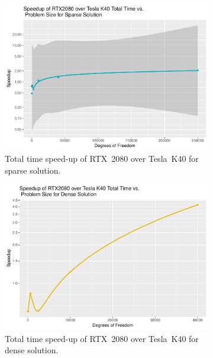 \begin{figure}
	\centering
	\begin{subfigure}{0.48\linewidth}
		\centering
		\includegraphics[width = \linewidth]{Plots/total_sparse_rtx_speedup_vs_n}
		\caption{Total time speed-up of RTX~2080 over Tesla~K40 for sparse solution.}
		\label{fig:total_rtx_sparse}
	\end{subfigure}\hfill
	\begin{subfigure}{0.48\linewidth}
		\centering
		\includegraphics[width=\linewidth]{Plots/total_dense_rtx_speedup_vs_n}
		\caption{Total time speed-up of RTX~2080 over Tesla~K40 for dense solution.}
		\label{fig:total_rtx_dense}
	\end{subfigure}\\
	\begin{subfigure}{0.48\linewidth}

\end{subfigure}
\end{figure}
